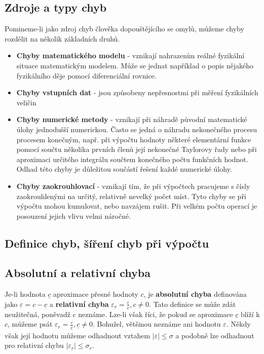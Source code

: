     \subsection{Zdroje a typy chyb}
      Pomineme-li jako zdroj chyb člověka dopouštějícího se omylů, můžeme chyby rozdělit na několik
      základních druhů.
      \begin{itemize}
        \item \textbf{Chyby matematického modelu} - vznikají nahrazením reálné fyzikální situace
              matematickým modelem. Může se jednat například o popis nějakého fyzikálního děje 
              pomocí diferenciální rovnice.
        \item \textbf{Chyby vstupních dat} - jsou způsobeny nepřesnostmi při měření fyzikálních
              veličin
        \item \textbf{Chyby numerické metody} - vznikají při náhradě původní matematické úlohy
              jednodušší numerickou. Často se jedná o náhradu nekonečného procesu procesem konečným,
              např. při výpočtu hodnoty některé elementární funkce pomocí součtu několika prvních
              členů její nekonečné Taylorovy řady nebo při aproximaci určitého integrálu souč\-tem
              konečného počtu funkčních hodnot. Odhad této chyby je důležitou součástí řešení každé
              numerické úlohy.
        \item \textbf{Chyby zaokrouhlovací} - vznikají tím, že při výpočtech pracujeme s čísly
              zaokrouhlenými na určitý, relativně nevelký počet míst. Tyto chyby se při výpočtu 
              mohou kumulovat, nebo navzájem rušit. Při vel\-kém počtu operací je posouzení jejich 
              vlivu velmi náročné.
      \end{itemize}
      
    \subsection{Definice chyb, šíření chyb při výpočtu}
      \subsection{Absolutní a relativní chyba}
        Je-li hodnota $\underline{c}$ aproximace přesné hodnoty $c$, je \textbf{absolutní chyba}
        definována jako $\varepsilon=c-\underline{c}$ a \textbf{relativní chyba}
        $\varepsilon_r=\frac{\varepsilon}{c},c\neq0$. Tato definice se může zdát neužitečná, 
        poněvadž $c$ neznáme. Lze-li však říci, že pokud se aproximace $\underline{c}$ blíží k $c$, 
        můžeme psát $\varepsilon_r=\frac{\varepsilon}{\underline{c}},\underline{c}\neq0$. Bohužel, 
        většinou neznáme ani hodnotu $\varepsilon$. Někdy však její hodnotu můžeme odhadnout vztahem
        $|\varepsilon|\leq\sigma$ a podobně lze odhadnout pro relativní chybu 
        $|\varepsilon_r|\leq\sigma_r$.
